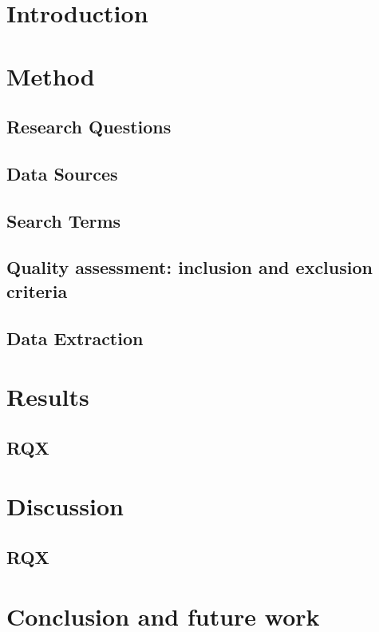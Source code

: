 \documentclass[conference]{IEEEtran}
\begin{document}
\begin{IEEEkeywords}
\end{IEEEkeywords}

\section{Introduction}

\section{Method}

\subsection{Research Questions}

\subsection{Data Sources}

\subsection{Search Terms}

\subsection{Quality assessment: inclusion and exclusion criteria}

\subsection{Data Extraction}

\section{Results}

\subsection{RQX}

\section{Discussion}

\subsection{RQX}

\section{Conclusion and future work}



\end{document}
